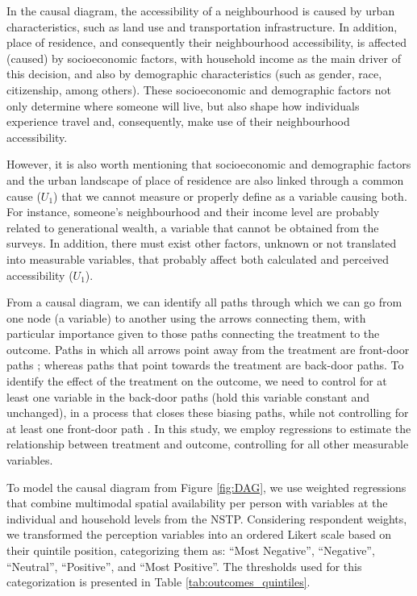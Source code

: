 \documentclass[preprint, 3p,
authoryear]{elsarticle} %
\begin{document}
In the causal diagram, the accessibility of a neighbourhood is caused by
urban characteristics, such as land use and transportation
infrastructure. In addition, place of residence, and consequently their
neighbourhood accessibility, is affected (caused) by socioeconomic
factors, with household income as the main driver of this decision, and
also by demographic characteristics (such as gender, race, citizenship,
among others). These socioeconomic and demographic factors not only
determine where someone will live, but also shape how individuals
experience travel and, consequently, make use of their neighbourhood
accessibility.

However, it is also worth mentioning that socioeconomic and demographic
factors and the urban landscape of place of residence are also linked
through a common cause (\(U_1\)) that we cannot measure or properly
define as a variable causing both. For instance, someone's neighbourhood
and their income level are probably related to generational wealth, a
variable that cannot be obtained from the surveys. In addition, there
must exist other factors, unknown or not translated into measurable
variables, that probably affect both calculated and perceived
accessibility (\(U_1\)).

From a causal diagram, we can identify all paths through which we can go
from one node (a variable) to another using the arrows connecting them,
with particular importance given to those paths connecting the treatment
to the outcome. Paths in which all arrows point away from the treatment
are front-door paths \citep{cunningham2021causal, huntington-klein2021};
whereas paths that point towards the treatment are back-door paths. To
identify the effect of the treatment on the outcome, we need to control
for at least one variable in the back-door paths (hold this variable
constant and unchanged), in a process that closes these biasing paths,
while not controlling for at least one front-door path
\citep{huntington-klein2021}. In this study, we employ regressions to
estimate the relationship between treatment and outcome, controlling for
all other measurable variables.

To model the causal diagram from Figure \ref{fig:DAG}, we use weighted
regressions that combine multimodal spatial availability per person with
variables at the individual and household levels from the NSTP.
Considering respondent weights, we transformed the perception variables
into an ordered Likert scale based on their quintile position,
categorizing them as: ``Most Negative'', ``Negative'', ``Neutral'',
``Positive'', and ``Most Positive''. The thresholds used for this
categorization is presented in Table \ref{tab:outcomes_quintiles}.
\end{document}
